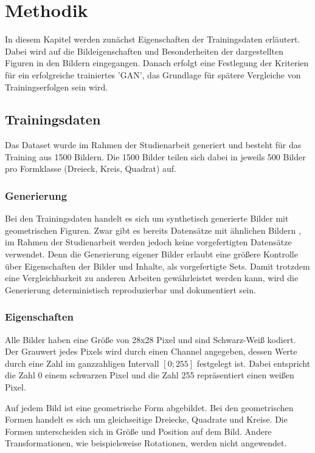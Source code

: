 
\chapter{Methodik}
In diesem Kapitel werden zunächst Eigenschaften der Trainingsdaten erläutert.
Dabei wird auf die Bildeigenschaften und Besonderheiten der dargestellten Figuren in den Bildern eingegangen.
Danach erfolgt eine Festlegung der Kriterien für ein erfolgreiche trainiertes 'GAN', das Grundlage für spätere Vergleiche von Trainingserfolgen sein wird.

\section{Trainingsdaten}

Das Dataset wurde im Rahmen der Studienarbeit generiert und besteht für das Training aus 1500 Bildern.
Die 1500 Bilder teilen sich dabei in jeweils 500 Bilder pro Formklasse (Dreieck, Kreis, Quadrat) auf.

\subsection{Generierung}
Bei den Trainingsdaten handelt es sich um synthetisch generierte Bilder mit geometrischen Figuren. 
Zwar gibt es bereits Datensätze mit ähnlichen Bildern \cite{dataset:2d-geometric-shapes-dataset, dataset:four-shapes}, im Rahmen der Studienarbeit werden jedoch keine vorgefertigten Datensätze verwendet. 
Denn die Generierung eigener Bilder erlaubt eine größere Kontrolle über Eigenschaften der Bilder und Inhalte, als vorgefertigte Sets.
Damit trotzdem eine Vergleichbarkeit zu anderen Arbeiten gewährleistet werden kann, wird die Generierung deterministisch reproduzierbar und dokumentiert sein.

\subsection{Eigenschaften}
Alle Bilder haben eine Größe von 28x28 Pixel und sind Schwarz-Weiß kodiert.
Der Grauwert jedes Pixels wird durch einen Channel angegeben, dessen Werte durch eine Zahl im ganzzahligen Intervall $[0; 255]$ festgelegt ist.
Dabei entspricht die Zahl 0 einem schwarzen Pixel und die Zahl 255 repräsentiert einen weißen Pixel.
\newline

Auf jedem Bild ist eine geometrische Form abgebildet.
Bei den geometrischen Formen handelt es sich um gleichseitige Dreiecke, Quadrate und Kreise.
Die Formen unterscheiden sich in Größe und Position auf dem Bild.
Andere Transformationen, wie beispielsweise Rotationen, werden nicht angewendet.
\newline

